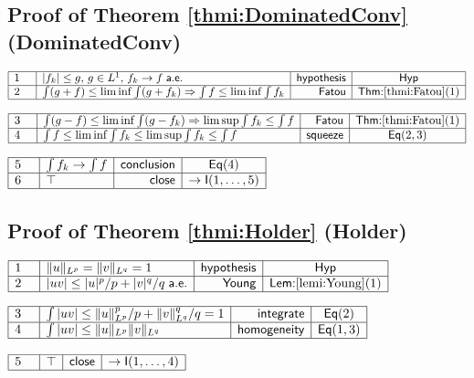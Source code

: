 \documentclass[11pt,reqno]{amsart}
\begin{document}
	\subsection*{Proof of Theorem \protect\ref{thmi:DominatedConv} (\textsf{DominatedConv})}
	\noindent$\begin{array}{|m{0.5cm}|l|r|c|}
	\hline
	1 & |f_{k}|\le g,\,g\in L^{1},\,f_{k}\to f\;\mathsf{a.e.} & \mathsf{hypothesis} & \mathsf{Hyp} \\ \hline
	2 & \int(g+f)\le\liminf\int(g+f_{k})\Rightarrow\int f\le\liminf\int f_{k} & \mathsf{Fatou} & \textsf{Thm:}\ref{thmi:Fatou}(1) \\ \hline
	\end{array}$
	\par\nointerlineskip\noindent$\begin{array}{|m{0.5cm}|l|r|c|}
	\hline
	3 & \int(g-f)\le\liminf\int(g-f_{k})\Rightarrow\limsup\int f_{k}\le\int f & \mathsf{Fatou} & \textsf{Thm:}\ref{thmi:Fatou}(1) \\ \hline
	4 & \int f\le\liminf\int f_{k}\le\limsup\int f_{k}\le\int f & \mathsf{squeeze} & \mathsf{Eq}(2,3) \\ \hline
	\end{array}$
	\par\nointerlineskip\noindent$\begin{array}{|m{0.5cm}|l|r|c|}
	\hline
	5 & \int f_{k}\to\int f & \mathsf{conclusion} & \mathsf{Eq}(4) \\ \hline
	6 & \top & \mathsf{close} & \to\mathsf{I}(1,\dots,5) \\ \hline
	\end{array}$
	\medskip
	
	\subsection*{Proof of Theorem \protect\ref{thmi:Holder} (\textsf{Holder})}
	\noindent$\begin{array}{|m{0.5cm}|l|r|c|}
	\hline
	1 & \|u\|_{L^{p}}=\|v\|_{L^{q}}=1 & \mathsf{hypothesis} & \mathsf{Hyp} \\ \hline
	2 & |uv|\le|u|^{p}/p+|v|^{q}/q\;\mathsf{a.e.} & \mathsf{Young} & \textsf{Lem:}\ref{lemi:Young}(1) \\ \hline
	\end{array}$
	\par\nointerlineskip\noindent$\begin{array}{|m{0.5cm}|l|r|c|}
	\hline
	3 & \int|uv|\le\|u\|_{L^{p}}^{p}/p+\|v\|_{L^{q}}^{q}/q=1 & \mathsf{integrate} & \mathsf{Eq}(2) \\ \hline
	4 & \int|uv|\le\|u\|_{L^{p}}\|v\|_{L^{q}} & \mathsf{homogeneity} & \mathsf{Eq}(1,3) \\ \hline
	\end{array}$
	\par\nointerlineskip\noindent$\begin{array}{|m{0.5cm}|l|r|c|}
	\hline
	5 & \top & \mathsf{close} & \to\mathsf{I}(1,\dots,4) \\ \hline
	\end{array}$
	\medskip
	
\end{document}
